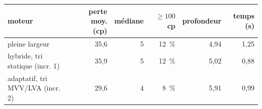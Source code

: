 \begin{tabular}{lrrrrr}
\toprule
moteur & perte moy. (cp) & médiane & $\ge 100$~cp & profondeur & temps (s)\\
\midrule
pleine largeur & 35{,}6 & 5 & 12~\% & 4{,}94 & 1{,}25\\
hybride, tri statique (incr. 1) & 35{,}9 & 5 & 12~\% & 5{,}02 & 0{,}88\\
adaptatif, tri MVV/LVA (incr. 2) & 29{,}6 & 4 & 8~\% & 5{,}91 & 0{,}99\\
\bottomrule
\end{tabular}
